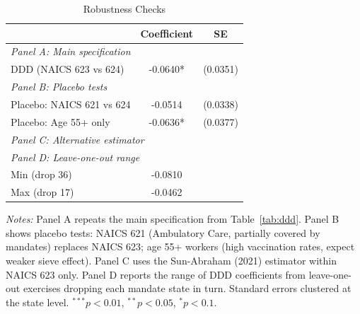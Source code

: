 \begin{table}[htbp]
\centering
\caption{Robustness Checks}
\label{tab:robustness}
\begin{threeparttable}
\begin{tabular}{lcc}
\hline\hline
 & Coefficient & SE \\
\hline
\multicolumn{3}{l}{\textit{Panel A: Main specification}} \\
DDD (NAICS 623 vs 624) & -0.0640* & (0.0351) \\
\multicolumn{3}{l}{\textit{Panel B: Placebo tests}} \\
Placebo: NAICS 621 vs 624 & -0.0514 & (0.0338) \\
Placebo: Age 55+ only & -0.0636* & (0.0377) \\
\multicolumn{3}{l}{\textit{Panel C: Alternative estimator}} \\
\multicolumn{3}{l}{\textit{Panel D: Leave-one-out range}} \\
Min (drop 36) & -0.0810 & \\
Max (drop 17) & -0.0462 & \\
\hline\hline
\end{tabular}
\begin{tablenotes}[flushleft]
\small
\item \textit{Notes:} Panel A repeats the main specification from Table~\ref{tab:ddd}. Panel B shows placebo tests: NAICS 621 (Ambulatory Care, partially covered by mandates) replaces NAICS 623; age 55+ workers (high vaccination rates, expect weaker sieve effect). Panel C uses the Sun-Abraham (2021) estimator within NAICS 623 only. Panel D reports the range of DDD coefficients from leave-one-out exercises dropping each mandate state in turn. Standard errors clustered at the state level. $^{***}p<0.01$, $^{**}p<0.05$, $^{*}p<0.1$.
\end{tablenotes}
\end{threeparttable}
\end{table}

